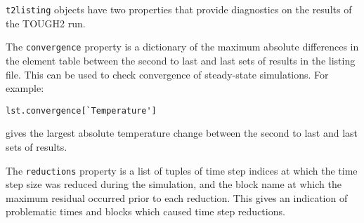 \texttt{t2listing} objects have two properties that provide diagnostics on the results of the TOUGH2 run.

The \texttt{convergence} property is a dictionary of the maximum absolute differences in the element table between the second to last and last sets of results in the listing file.  This can be used to check convergence of steady-state simulations.  For example:

\begin{verbatim}
lst.convergence[`Temperature']
\end{verbatim}

gives the largest absolute temperature change between the second to last and last sets of results.

The \texttt{reductions} property is a list of tuples of time step indices at which the time step size was reduced during the simulation, and the block name at which the maximum residual occurred prior to each reduction.  This gives an indication of problematic times and blocks which caused time step reductions.

